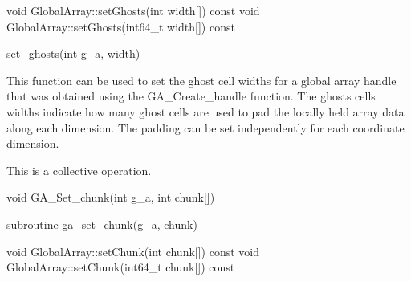 \documentclass[12pt]{article}
\begin{document}
\begin{cxxapi}
\begin{cxxcode}
void GlobalArray::setGhosts(int width[]) const
void GlobalArray::setGhosts(int64_t width[]) const
\end{cxxcode}
\begin{funcargs}
\end{funcargs}
\end{cxxapi}

\begin{pyapi}
\begin{pycode}
set_ghosts(int g_a, width)
\end{pycode}
\end{pyapi}
\gcoll

\begin{desc}

  This function can be used to set the ghost cell widths for a global
  array handle that was obtained using the GA_Create_handle function.
  The ghosts cells widths indicate how many ghost cells are used to
  pad the locally held array data along each dimension. The padding
  can be set independently for each coordinate dimension.

  This is a collective operation.

\end{desc}


\begin{capi}
\begin{ccode}
void GA_Set_chunk(int g_a, int chunk[])
\end{ccode}
\begin{funcargs}
\end{funcargs}
\end{capi}

\begin{fapi}
\begin{fcode}
subroutine ga_set_chunk(g_a, chunk)
\end{fcode}
\begin{funcargs}
\end{funcargs}
\end{fapi}

\begin{cxxapi}
\begin{cxxcode}
void GlobalArray::setChunk(int chunk[]) const
void GlobalArray::setChunk(int64_t chunk[]) const
\end{cxxcode}
\begin{funcargs}
\end{funcargs}
\end{cxxapi}
\end{document}
